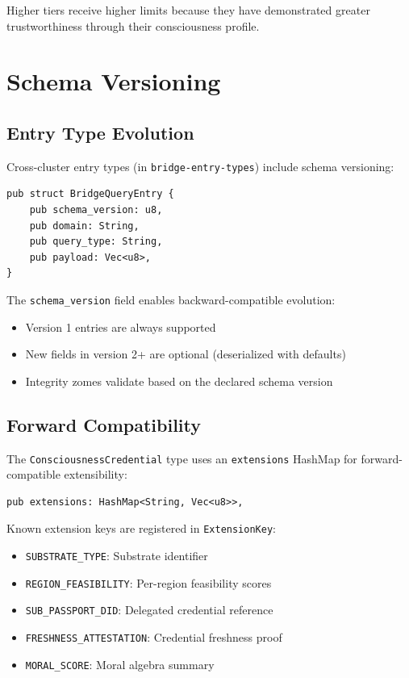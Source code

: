 \documentclass[11pt,twocolumn]{article}
\begin{document}
Higher tiers receive higher limits because they have demonstrated greater
trustworthiness through their consciousness profile.

\section{Schema Versioning}

\subsection{Entry Type Evolution}

Cross-cluster entry types (in \texttt{bridge-entry-types}) include schema
versioning:

\begin{lstlisting}
pub struct BridgeQueryEntry {
    pub schema_version: u8,
    pub domain: String,
    pub query_type: String,
    pub payload: Vec<u8>,
}
\end{lstlisting}

The \texttt{schema\_version} field enables backward-compatible evolution:
\begin{itemize}[nosep]
  \item Version 1 entries are always supported
  \item New fields in version 2+ are optional (deserialized with defaults)
  \item Integrity zomes validate based on the declared schema version
\end{itemize}

\subsection{Forward Compatibility}

The \texttt{ConsciousnessCredential} type uses an \texttt{extensions}
HashMap for forward-compatible extensibility:

\begin{lstlisting}
pub extensions: HashMap<String, Vec<u8>>,
\end{lstlisting}

Known extension keys are registered in \texttt{ExtensionKey}:
\begin{itemize}[nosep]
  \item \texttt{SUBSTRATE\_TYPE}: Substrate identifier
  \item \texttt{REGION\_FEASIBILITY}: Per-region feasibility scores
  \item \texttt{SUB\_PASSPORT\_DID}: Delegated credential reference
  \item \texttt{FRESHNESS\_ATTESTATION}: Credential freshness proof
  \item \texttt{MORAL\_SCORE}: Moral algebra summary
\end{itemize}
\end{document}
